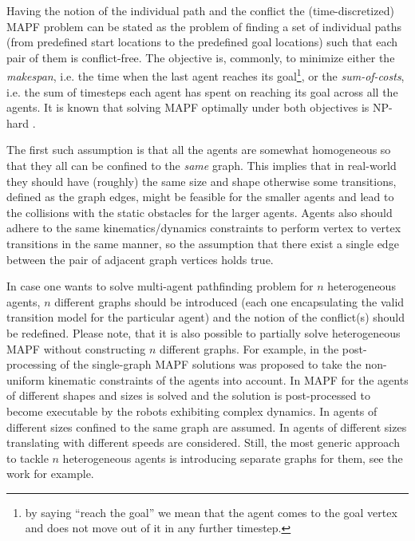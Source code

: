 
Having the notion of the individual path and the conflict the (time-discretized) MAPF problem can be stated as the problem of finding a set of individual paths (from predefined start locations to the predefined goal locations) such that each pair of them is conflict-free. The objective is, commonly, to minimize either the \textit{makespan}, i.e. the time when the last agent reaches its goal\footnote{by saying ``reach the goal'' we mean that the agent comes to the goal vertex and does not move out of it in any further timestep.}, or the \textit{sum-of-costs}, i.e. the sum of timesteps each agent has spent on reaching its goal across all the agents. It is known that solving MAPF optimally under both objectives is NP-hard \cite{}.


The first such assumption is that all the agents are somewhat homogeneous so that they all can be confined to the \textit{same} graph. This implies that in real-world they should have (roughly) the same size and shape otherwise some transitions, defined as the graph edges, might be feasible for the smaller agents and lead to the collisions with the static obstacles for the larger agents. Agents also should adhere to the same kinematics/dynamics constraints to perform vertex to vertex transitions in the same manner, so the assumption that there exist a single edge between the pair of adjacent graph vertices holds true.

In case one wants to solve multi-agent pathfinding problem for $n$ heterogeneous agents, $n$ different graphs should be introduced (each one encapsulating the valid transition model for the particular agent) and the notion of the conflict(s) should be redefined. Please note, that it is also possible to partially solve heterogeneous MAPF without constructing $n$ different graphs. For example, in \cite{} the post-processing of the single-graph MAPF solutions was proposed to take the non-uniform kinematic constraints of the agents into account. In \cite{} MAPF for the agents of different shapes and sizes is solved and the solution is post-processed to become executable by the robots exhibiting complex dynamics. In \cite{} agents of different sizes confined to the same graph are assumed. In \cite{} agents of different sizes translating with different speeds are considered. Still, the most generic approach to tackle $n$ heterogeneous agents is introducing separate graphs for them, see the work \cite{} for example.

